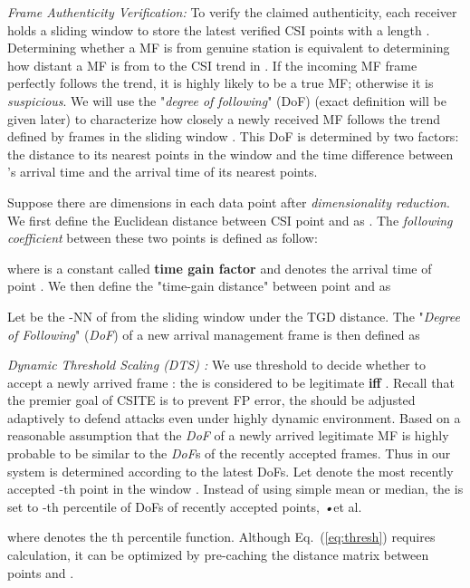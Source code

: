 \documentclass[conference]{IEEEtran}
\newcommand{\eqqref}[1]{Eq.~(\ref{#1})}
\def\ie{\textit{•}{et al.}\xspace}
\begin{document}
\textit{Frame Authenticity Verification:}
To verify the claimed authenticity,
 each receiver holds a sliding window 
 to store the latest verified CSI points with a length .
Determining whether a MF is from genuine station is equivalent to
 determining how distant a MF is from to the CSI trend in .
If the incoming MF frame perfectly follows the trend, it is highly
 likely to be a true MF;  otherwise it is \emph{suspicious}.
We will use the "\emph{degree of following}" (DoF) (exact definition
will be given later) to characterize how closely   a newly received MF
  follows the trend defined by frames in the sliding window .
This DoF is determined by two factors: the distance to its  nearest
 points in the window   and the time difference between 's arrival
 time  and the  arrival time of its  nearest points.

Suppose there are  dimensions in each data point after
 \textit{dimensionality reduction}.
We first define the Euclidean distance between CSI point  and  as
 .
 The \textit{following coefficient}
 between these two points is defined as follow:


where  is a constant called \textbf{time gain factor} and 
 denotes the arrival time of point .
We then define the "time-gain distance" between point  and  as


Let  be the -NN of 
 from the sliding window   under the TGD distance.
The "\emph{Degree of Following}" (\textit{DoF}) of a new arrival
 management frame  is then defined as



\textit{Dynamic Threshold Scaling (DTS) :}
We use threshold  to
 decide whether to accept a newly arrived frame :
 the  is considered to be legitimate \textbf{iff} .
Recall that the premier goal of CSITE is to
 prevent FP error, the  should be adjusted adaptively  to defend attacks
 even under highly dynamic environment.
 Based on a reasonable assumption that the \textit{DoF} of a newly arrived legitimate MF  is highly probable to be similar to the \textit{DoF}s of the recently accepted frames.
 Thus in our system  is determined according to the latest DoFs.
 Let  denote the most recently accepted -th point in the
 window .
Instead of using simple mean or median,
 the  is set to -th percentile of DoFs of recently accepted
  points, \ie

where  denotes the th percentile function. Although
\eqqref{eq:thresh} requires  calculation, it can be
optimized by pre-caching the distance matrix between points  and .
\end{document}

